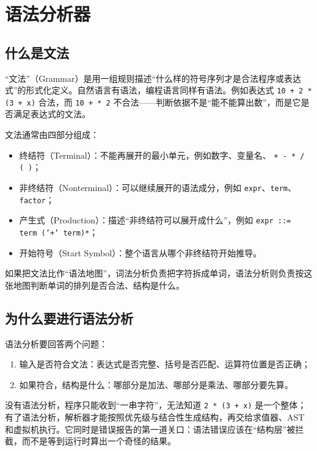 \section{语法分析器}

\subsection{什么是文法}

“文法”（Grammar）是用一组规则描述“什么样的符号序列才是合法程序或表达式”的形式化定义。自然语言有语法，编程语言同样有语法。例如表达式 \texttt{10 + 2 * (3 + x)} 合法，而 \texttt{10 + * 2} 不合法——判断依据不是“能不能算出数”，而是它是否满足表达式的文法。

文法通常由四部分组成：

\begin{itemize}
\item 终结符（Terminal）：不能再展开的最小单元，例如数字、变量名、 \texttt{+ - * / ( )}；
\item 非终结符（Nonterminal）：可以继续展开的语法成分，例如 \texttt{expr}、\texttt{term}、\texttt{factor}；
\item 产生式（Production）：描述“非终结符可以展开成什么”，例如 \texttt{expr ::= term ('+' term)*}；
\item 开始符号（Start Symbol）：整个语言从哪个非终结符开始推导。
\end{itemize}

如果把文法比作“语法地图”，词法分析负责把字符拆成单词，语法分析则负责按这张地图判断单词的排列是否合法、结构是什么。

\subsection{为什么要进行语法分析}

语法分析要回答两个问题：

\begin{enumerate}
\item 输入是否符合文法：表达式是否完整、括号是否匹配、运算符位置是否正确；
\item 如果符合，结构是什么：哪部分是加法、哪部分是乘法、哪部分要先算。
\end{enumerate}

没有语法分析，程序只能收到“一串字符”，无法知道 \texttt{2 * (3 + x)} 是一个整体；有了语法分析，解析器才能按照优先级与结合性生成结构，再交给求值器、AST 和虚拟机执行。它同时是错误报告的第一道关口：语法错误应该在“结构层”被拦截，而不是等到运行时算出一个奇怪的结果。

